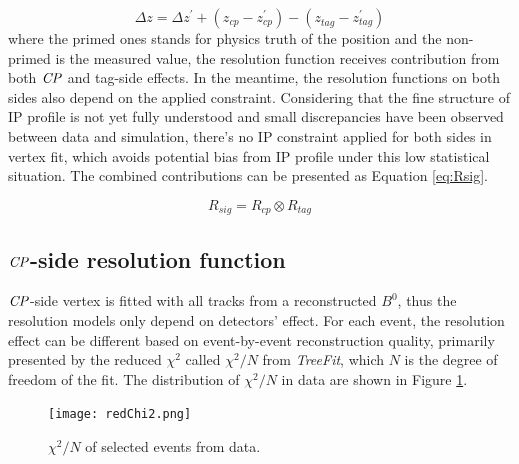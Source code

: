 \begin{equation}\label{eq:dz}
\Delta z 
=\Delta z^{'} + (z_{cp}^{}- z_{cp}^{'}) - (z_{tag}^{}- z_{tag}^{'}) 
\end{equation}where the primed ones stands for physics truth of the position and the non-primed is the measured value, the resolution function receives contribution from both $\it{CP}$ and tag-side effects. In the meantime, the resolution functions on both sides also depend on the applied constraint. Considering that the fine structure of IP profile is not yet fully understood and small discrepancies have been observed between data and simulation\cite{jpsiks_ichep}, there's no IP constraint applied for both sides in vertex fit, which avoids potential bias from  IP profile under this low statistical situation. The combined contributions can be presented as Equation \ref{eq:Rsig}.

\begin{equation}\label{eq:Rsig}
R_{sig}=R_{cp}\otimes R_{tag}
\end{equation}

\subsection{$\it{CP}$-side resolution function}

$\it{CP}$-side vertex is fitted with all tracks from a reconstructed $B^0$, thus the resolution models only depend on detectors' effect. For each event, the resolution effect can be different based on event-by-event reconstruction quality, primarily presented by the reduced $\chi^2$ called $\chi^2/N$ from \textit{TreeFit}, which $N$ is the degree of freedom of the fit. The distribution of $\chi^2/N$ in data are shown in Figure \ref{fig:redchi2}. 

\begin{figure}[H]
	\centering
	\texttt{[image: redChi2.png]}
	\caption{$\chi^2/N$ of selected events from data.}
	\label{fig:redchi2}
\end{figure}

